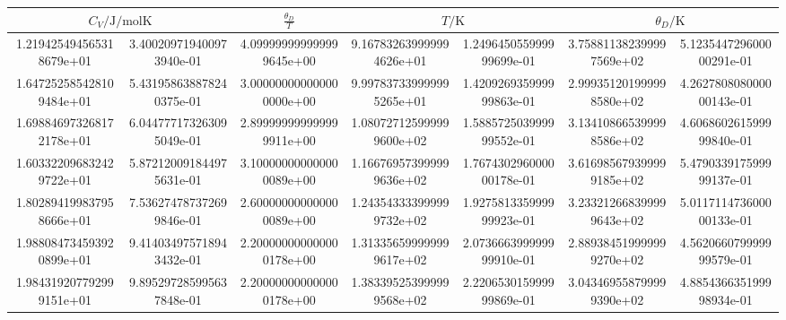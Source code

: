 \begin{table}
  \centering
  \begin{tabular}{S[round-mode = places , round-precision = 1,scientific-notation=fixed, fixed-exponent = 0]@{${}\pm{}$} S[round-mode = places , round-precision = 0] S[round-mode = places , round-precision = 1,scientific-notation=fixed, fixed-exponent = 0] S[round-mode = places , round-precision = 1,scientific-notation=fixed, fixed-exponent = 0]@{${}\pm{}$} S[round-mode = places , round-precision = 1,scientific-notation=fixed, fixed-exponent = 0] S[round-mode = places , round-precision = 0,scientific-notation=fixed, fixed-exponent = 0]@{${}\pm{}$} S[round-mode = places , round-precision = 1,scientific-notation=fixed, fixed-exponent = 0]}
    \toprule
	 &
	$ \frac{\theta_D}{T}  $ &
	 &
	 \\
    \midrule
	1.219425494565318679e+01 & 3.400209719400973940e-01 & 4.099999999999999645e+00 & 9.167832639999994626e+01 & 1.249645055999999699e-01 & 3.758811382399997569e+02 & 5.123544729600000291e-01\\
	1.647252585428109484e+01 & 5.431958638878240375e-01 & 3.000000000000000000e+00 & 9.997837339999995265e+01 & 1.420926935999999863e-01 & 2.999351201999998580e+02 & 4.262780808000000143e-01\\
	1.698846973268172178e+01 & 6.044777173263095049e-01 & 2.899999999999999911e+00 & 1.080727125999999600e+02 & 1.588572503999999552e-01 & 3.134108665399998586e+02 & 4.606860261599999840e-01\\
	1.603322096832429722e+01 & 5.872120091844975631e-01 & 3.100000000000000089e+00 & 1.166769573999999636e+02 & 1.767430296000000178e-01 & 3.616985679399999185e+02 & 5.479033917599999137e-01\\
	1.802894199837958666e+01 & 7.536274787372699846e-01 & 2.600000000000000089e+00 & 1.243543333999999732e+02 & 1.927581335999999923e-01 & 3.233212668399999643e+02 & 5.011711473600000133e-01\\
	1.988084734593920899e+01 & 9.414034975718943432e-01 & 2.200000000000000178e+00 & 1.313356599999999617e+02 & 2.073666399999999910e-01 & 2.889384519999999270e+02 & 4.562066079999999579e-01\\
	1.984319207792999151e+01 & 9.895297285995637848e-01 & 2.200000000000000178e+00 & 1.383395253999999568e+02 & 2.220653015999999869e-01 & 3.043469558799999390e+02 & 4.885436635199998934e-01\\

\end{tabular}
\end{table}
